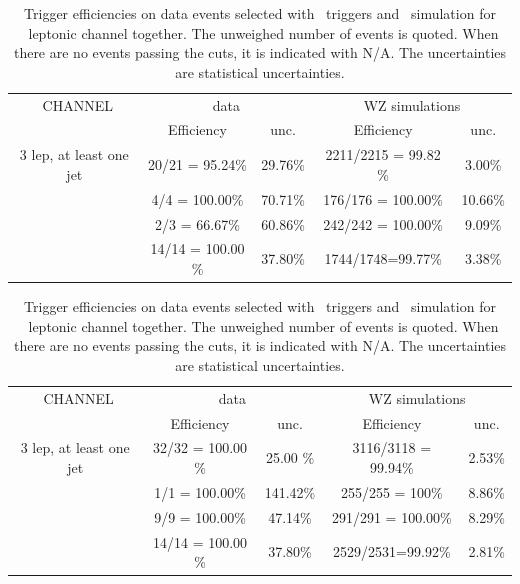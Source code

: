 \begin{table}[htbp]
	\centering
	\caption{Trigger efficiencies on data events selected with \Etmis\ triggers and \WZ\ simulation for \eee\ leptonic channel together. The unweighed number of events is quoted. When there are no events passing the cuts, it is indicated with N/A. The uncertainties are statistical uncertainties.}

	\begin{tabular}{c|c|c|c|c}
		\toprule 
		\eee\ CHANNEL & \multicolumn{2}{c|}{data} & \multicolumn{2}{c}{WZ simulations} \\ 
		& Efficiency & unc. & Efficiency & unc. \\
		\midrule
		3 lep,  at least one jet & 20/21 = 95.24\%  & 29.76\% & 2211/2215 = 99.82 \% & 3.00\%  \\ 
		\hline 
		\STSR & 4/4 = 100.00\% & 70.71\% & 176/176 = 100.00\% & 10.66\% \\ 
		\hline 
		\TTSR & 2/3 = 66.67\% & 60.86\% & 242/242 = 100.00\% & 9.09\% \\ 
		\hline 
		\WZCR & 14/14 = 100.00 \% & 37.80\% & 1744/1748=99.77\% & 3.38\% \\ 
		\bottomrule
	\end{tabular} 
\end{table}
\begin{table}[htbp]
	\centering
	\caption{Trigger efficiencies on data events selected with \Etmis\ triggers and \WZ\ simulation for \eemu\ leptonic channel together. The unweighed number of events is quoted. When there are no events passing the cuts, it is indicated with N/A. The uncertainties are statistical uncertainties.}

	\begin{tabular}{c|c|c|c|c}
		\toprule
		\eemu\ CHANNEL & \multicolumn{2}{c|}{data} & \multicolumn{2}{c}{WZ simulations} \\ 
		& Efficiency & unc. & Efficiency & unc. \\
		\midrule
		3 lep,  at least one jet & 32/32 = 100.00 \% & 25.00 \% & 3116/3118 = 99.94\%  & 2.53\% \\ 
		\hline 
		\STSR & 1/1 = 100.00\%& 141.42\% & 255/255 = 100\% & 8.86\% \\ 
		\hline 
		\TTSR & 9/9 = 100.00\% & 47.14\% &291/291 = 100.00\% & 8.29\% \\ 
		\hline 
		\WZCR & 14/14 = 100.00 \% & 37.80\% & 2529/2531=99.92\% & 2.81\% \\ 
		\bottomrule
	\end{tabular} 
\end{table}	
